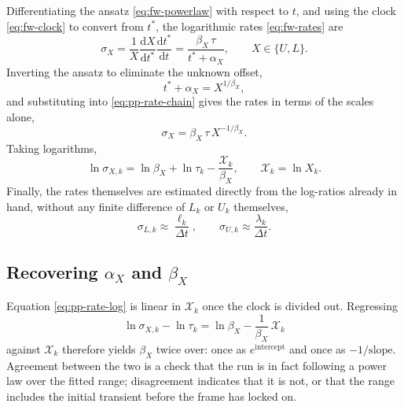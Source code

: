 Differentiating the ansatz \eqref{eq:fw-powerlaw} with respect to $t$, and
using the clock \eqref{eq:fw-clock} to convert from $t^*$, the logarithmic
rates \eqref{eq:fw-rates} are
\begin{equation}\label{eq:pp-rate-chain}
  \sigma_X = \frac{1}{X}\frac{\mathrm{d} X}{\mathrm{d} t^*}\frac{\mathrm{d} t^*}{\mathrm{d} t}
  = \frac{\beta_X\, \tau}{t^* + \alpha_X},
  \qquad X \in \{U, L\}.
\end{equation}
Inverting the ansatz to eliminate the unknown offset,
\begin{equation}\label{eq:pp-tstar-offset}
  t^* + \alpha_X = X^{1/\beta_X},
\end{equation}
and substituting into \eqref{eq:pp-rate-chain} gives the rates in terms of the
scales alone,
\begin{equation}\label{eq:pp-rate}
  \sigma_X = \beta_X\, \tau\, X^{-1/\beta_X}.
\end{equation}
Taking logarithms,
\begin{equation}\label{eq:pp-rate-log}
  \ln \sigma_{X,k} = \ln \beta_X + \ln \tau_k - \frac{\mathcal{X}_k}{\beta_X},
  \qquad \mathcal{X}_k = \ln X_k .
\end{equation}
Finally, the rates themselves are estimated directly from the log-ratios
already in hand, without any finite difference of $L_k$ or $U_k$ themselves,
\begin{equation}\label{eq:pp-rate-fd}
  \sigma_{L,k} \approx \frac{\ell_k}{\Delta t},
  \qquad
  \sigma_{U,k} \approx \frac{\lambda_k}{\Delta t}.
\end{equation}

\subsection{Recovering \texorpdfstring{$\alpha_X$}{alpha\_X} and \texorpdfstring{$\beta_X$}{beta\_X}}\label{ssec:pp-fit}

Equation \eqref{eq:pp-rate-log} is linear in $\mathcal{X}_k$ once the clock is
divided out. Regressing
\begin{equation}\label{eq:pp-regression}
  \ln \sigma_{X,k} - \ln \tau_k = \ln \beta_X - \frac{1}{\beta_X}\, \mathcal{X}_k
\end{equation}
against $\mathcal{X}_k$ therefore yields $\beta_X$ twice over: once as
$e^{\text{intercept}}$ and once as $-1/\text{slope}$. Agreement between the two
is a check that the run is in fact following a power law over the fitted range;
disagreement indicates that it is not, or that the range includes the initial
transient before the frame has locked on.


